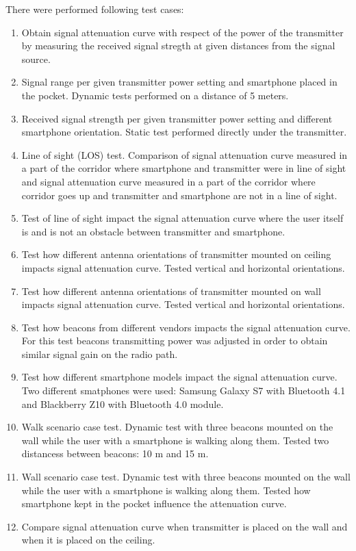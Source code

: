 \documentclass[../main.tex]{subfiles}
\begin{document}
There were performed following test cases:
\begin{enumerate}
	\item Obtain signal attenuation curve with respect of the power of the transmitter by measuring the received signal stregth at given distances from the signal source.
	\item Signal range per given transmitter power setting and smartphone placed in the pocket. Dynamic tests performed on a distance of 5 meters.
	\item Received signal strength per given transmitter power setting and different smartphone orientation. Static test performed directly under the transmitter.
	\item Line of sight (LOS) test. Comparison of signal attenuation curve measured in a part of the corridor where smartphone and transmitter were in line of sight and signal attenuation curve measured in a part of the corridor where corridor goes up and transmitter and smartphone are not in a line of sight.
	\item Test of line of sight impact the signal attenuation curve where the user itself is and is not an obstacle between transmitter and smartphone.
	\item Test how different antenna orientations of transmitter mounted on ceiling impacts signal attenuation curve. Tested vertical and horizontal orientations.
	\item Test how different antenna orientations of transmitter mounted on wall impacts signal attenuation curve. Tested vertical and horizontal orientations.
	\item Test how beacons from different vendors impacts the signal attenuation curve. For this test beacons transmitting power was adjusted in order to obtain similar signal gain on the radio path.
	\item Test how different smartphone models impact the signal attenuation curve. Two different smatphones were used: Samsung Galaxy S7 with Bluetooth 4.1 and Blackberry Z10 with Bluetooth 4.0 module.
	\item Walk scenario case test. Dynamic test with three beacons mounted on the wall while the user with a smartphone is walking along them. Tested two distancess between beacons: 10 m and 15 m.
	\item Wall scenario case test. Dynamic test with three beacons mounted on the wall while the user with a smartphone is walking along them. Tested how smartphone kept in the pocket influence the attenuation curve.
	\item  Compare signal attenuation curve when transmitter is placed on the wall and when it is placed on the ceiling.
\end{enumerate}
\end{document}
